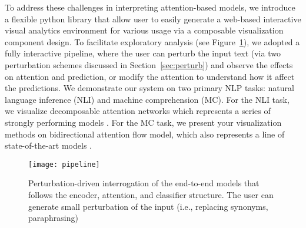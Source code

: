 To address these challenges in interpreting attention-based models, 
we introduce a flexible python library that allow user to easily generate a web-based interactive visual analytics environment for various usage via a composable visualization component design.
%
To facilitate exploratory analysis (see Figure~\ref{fig:modelPipeline}), we adopted a fully interactive pipeline, where the user can perturb the input text (via two perturbation schemes discussed in Section~\ref{sec:perturb}) and observe the effects on attention and prediction, or modify the attention to understand how it affect the predictions.
%
We demonstrate our system on two primary NLP tasks: natural language
inference (NLI) and machine comprehension (MC). For the NLI task, we visualize
decomposable attention networks which represents a series of strongly performing models \cite{Parikh2016}.
For the MC task, we present your visualization methods on bidirectional attention flow model,
which also represents a line of state-of-the-art models \cite{Seo2016}.

\begin{figure}[htbp]
\centering
\vspace{-2mm}
 \texttt{[image: pipeline]}
 \vspace{-3mm}
 \caption{
 Perturbation-driven interrogation of the end-to-end models that follows the encoder, attention, and classifier structure. The user can generate small perturbation of the input (i.e., replacing synonyms, paraphrasing)
 }
 \vspace{-3mm}
\label{fig:modelPipeline}
\end{figure}


